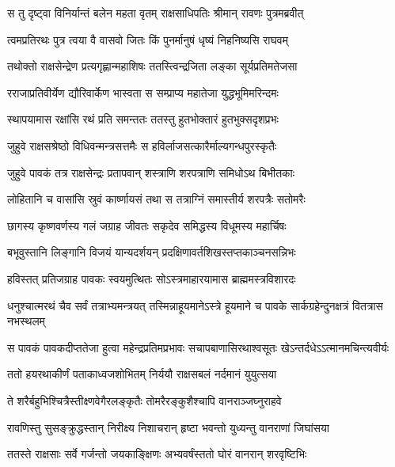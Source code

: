 \twolineshloka
{स तु दृष्ट्वा विनिर्यान्तं बलेन महता वृतम्}
{राक्षसाधिपतिः श्रीमान् रावणः पुत्रमब्रवीत्} %

\twolineshloka
{त्वमप्रतिरथः पुत्र त्वया वै वासवो जितः}
{किं पुनर्मानुषं धृष्यं निहनिष्यसि राघवम्} %

\twolineshloka
{तथोक्तो राक्षसेन्द्रेण प्रत्यगृह्णान्महाशिषः}
{ततस्त्विन्द्रजिता लङ्का सूर्यप्रतिमतेजसा} %

\twolineshloka
{रराजाप्रतिवीर्येण द्यौरिवार्केण भास्वता}
{स सम्प्राप्य महातेजा युद्धभूमिमरिन्दमः} %

\twolineshloka
{स्थापयामास रक्षांसि रथं प्रति समन्ततः}
{ततस्तु हुतभोक्तारं हुतभुक्सदृशप्रभः} %

\twolineshloka
{जुहुवे राक्षसश्रेष्ठो विधिवन्मन्त्रसत्तमैः}
{स हविर्लाजसत्कारैर्माल्यगन्धपुरस्कृतैः} %

\twolineshloka
{जुहुवे पावकं तत्र राक्षसेन्द्रः प्रतापवान्}
{शस्त्राणि शरपत्राणि समिधोऽथ बिभीतकाः} %

\twolineshloka
{लोहितानि च वासांसि स्रुवं कार्ष्णायसं तथा}
{स तत्राग्निं समास्तीर्य शरपत्रैः सतोमरैः} %

\twolineshloka
{छागस्य कृष्णवर्णस्य गलं जग्राह जीवतः}
{सकृदेव समिद्धस्य विधूमस्य महार्चिषः} %

\twolineshloka
{बभूवुस्तानि लिङ्गानि विजयं यान्यदर्शयन्}
{प्रदक्षिणावर्तशिखस्तप्तकाञ्चनसन्निभः} %

\twolineshloka
{हविस्तत् प्रतिजग्राह पावकः स्वयमुत्थितः}
{सोऽस्त्रमाहारयामास ब्राह्ममस्त्रविशारदः} %

\threelineshloka
{धनुश्चात्मरथं चैव सर्वं तत्राभ्यमन्त्रयत्}
{तस्मिन्नाहूयमानेऽस्त्रे हूयमाने च पावके}
{सार्कग्रहेन्दुनक्षत्रं वितत्रास नभस्थलम्} %

\twolineshloka
{स पावकं पावकदीप्ततेजा हुत्वा महेन्द्रप्रतिमप्रभावः}
{सचापबाणासिरथाश्वसूतः खेऽन्तर्दधेऽऽत्मानमचिन्त्यवीर्यः} %

\twolineshloka
{ततो हयरथाकीर्णं पताकाध्वजशोभितम्}
{निर्ययौ राक्षसबलं नर्दमानं युयुत्सया} %

\twolineshloka
{ते शरैर्बहुभिश्चित्रैस्तीक्ष्णवेगैरलङ्कृतैः}
{तोमरैरङ्कुशैश्चापि वानराञ्जघ्नुराहवे} %

\twolineshloka
{रावणिस्तु सुसङ्क्रुद्धस्तान् निरीक्ष्य निशाचरान्}
{हृष्टा भवन्तो युध्यन्तु वानराणां जिघांसया} %

\twolineshloka
{ततस्ते राक्षसाः सर्वे गर्जन्तो जयकाङ्क्षिणः}
{अभ्यवर्षंस्ततो घोरं वानरान् शरवृष्टिभिः} %

